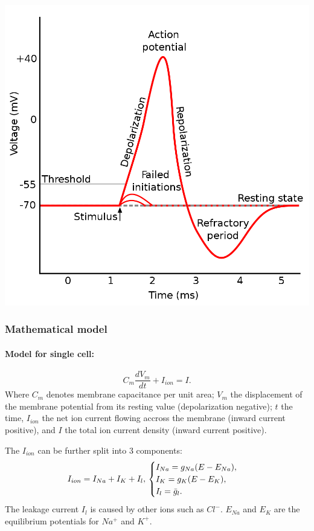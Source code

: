 \includegraphics[scale=0.3]{graphics/ActionPotential2}

\subsubsection{Mathematical model}

\paragraph{Model for single cell:}
$$ C_m \frac{dV_m}{dt} + I_{ion} = I. $$
Where $C_m$ denotes membrane capacitance per unit area; $V_m$ the displacement of the membrane potential from its resting value (depolarization
negative); $t$ the time, $I_{ion}$ the net ion current flowing accross the
membrane (inward current positive), and $I$ the total ion current density (inward current positive).

The $I_{ion}$ can be further split into 3 components:
$$ I_{ion} = I_{Na} + I_{K} + I_{l}, \\
\begin{cases}
  I_{Na} = g_{Na} (E - E_{Na}), \\
  I_{K} = g_{K} (E - E_{K}), \\
  I_{l} = {\bar{g}}_{l}.
\end{cases}
$$
The leakage current $I_{l}$ is caused by other ions such as $Cl^{-}$.
$E_{Na}$ and $E_{K}$ are the equilibrium potentials for $Na^{+}$ and $K^{+}$.

